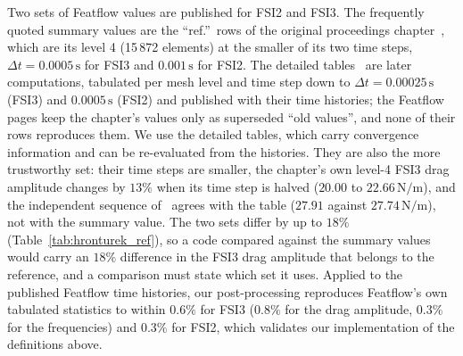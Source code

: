 Two sets of Featflow values are published for FSI2 and FSI3.
The frequently quoted summary values are the ``ref.''\ rows of the original proceedings chapter~\citep{Turek2006}, which are its level 4 (15\,872 elements) at the smaller of its two time steps, $\Delta t = 0.0005\,\mathrm{s}$ for FSI3 and $0.001\,\mathrm{s}$ for FSI2.
The detailed tables~\citep{FeatflowFSI,Turek2010} are later computations, tabulated per mesh level and time step down to $\Delta t = 0.00025\,\mathrm{s}$ (FSI3) and $0.0005\,\mathrm{s}$ (FSI2) and published with their time histories; the Featflow pages keep the chapter's values only as superseded ``old values'', and none of their rows reproduces them.
We use the detailed tables, which carry convergence information and can be re-evaluated from the histories.
They are also the more trustworthy set: their time steps are smaller, the chapter's own level-4 FSI3 drag amplitude changes by $13\%$ when its time step is halved ($20.00$ to $22.66\,\mathrm{N/m}$), and the independent sequence of~\citet{Failer2020} agrees with the table ($27.91$ against $27.74\,\mathrm{N/m}$), not with the summary value.
The two sets differ by up to $18\%$ (Table~\ref{tab:hronturek_ref}), so a code compared against the summary values would carry an $18\%$ difference in the FSI3 drag amplitude that belongs to the reference, and a comparison must state which set it uses.
Applied to the published Featflow time histories, our post-processing reproduces Featflow's own tabulated statistics to within $0.6\%$ for FSI3 ($0.8\%$ for the drag amplitude, $0.3\%$ for the frequencies) and $0.3\%$ for FSI2, which validates our implementation of the definitions above.

